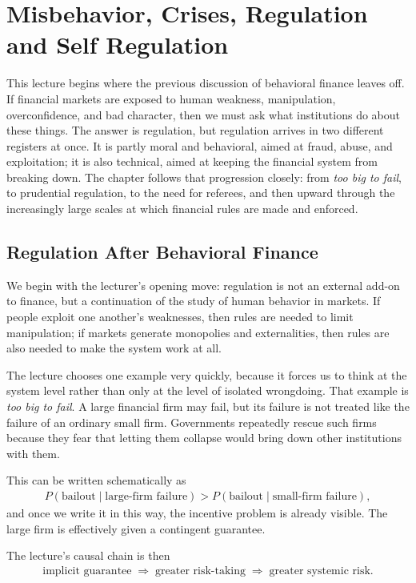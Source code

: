 \chapter{Misbehavior, Crises, Regulation and Self Regulation}

This lecture begins where the previous discussion of behavioral finance leaves off. If financial markets are exposed to human weakness, manipulation, overconfidence, and bad character, then we must ask what institutions do about these things. The answer is regulation, but regulation arrives in two different registers at once. It is partly moral and behavioral, aimed at fraud, abuse, and exploitation; it is also technical, aimed at keeping the financial system from breaking down. The chapter follows that progression closely: from \emph{too big to fail}, to prudential regulation, to the need for referees, and then upward through the increasingly large scales at which financial rules are made and enforced.

\section{Regulation After Behavioral Finance}

We begin with the lecturer's opening move: regulation is not an external add-on to finance, but a continuation of the study of human behavior in markets. If people exploit one another's weaknesses, then rules are needed to limit manipulation; if markets generate monopolies and externalities, then rules are also needed to make the system work at all.

The lecture chooses one example very quickly, because it forces us to think at the system level rather than only at the level of isolated wrongdoing. That example is \emph{too big to fail}. A large financial firm may fail, but its failure is not treated like the failure of an ordinary small firm. Governments repeatedly rescue such firms because they fear that letting them collapse would bring down other institutions with them.

This can be written schematically as
\begin{align}
P(\text{bailout}\mid \text{large-firm failure})
>
P(\text{bailout}\mid \text{small-firm failure}),
\end{align}
and once we write it in this way, the incentive problem is already visible. The large firm is effectively given a contingent guarantee.

The lecture's causal chain is then
\begin{align}
\text{implicit guarantee}
\;\Rightarrow\;
\text{greater risk-taking}
\;\Rightarrow\;
\text{greater systemic risk}.
\end{align}

